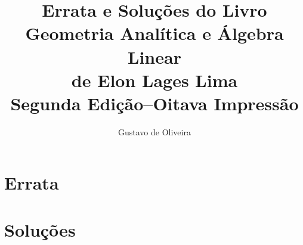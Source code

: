 \documentclass[a4paper,11pt]{article}
\title{Errata e Soluções do Livro\\Geometria Analítica e Álgebra Linear\\de Elon Lages Lima\\Segunda Edição--Oitava Impressão}
\author{Gustavo de Oliveira}
\begin{document}
\maketitle
\tableofcontents

\part{Errata}


\part{Soluções}

\end{document}
